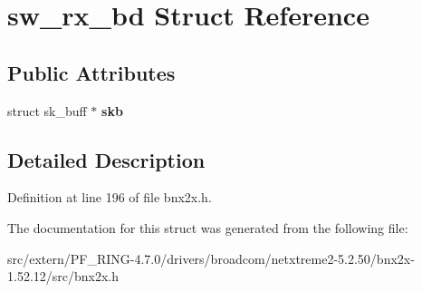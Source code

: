 \hypertarget{structsw__rx__bd}{
\section{sw\_\-rx\_\-bd Struct Reference}
\label{structsw__rx__bd}
}
\subsection*{Public Attributes}
\begin{DoxyCompactItemize}
\item 
\hypertarget{structsw__rx__bd_a35b0d9dafc6281de60d54722f16a5ba2}{
struct sk\_\-buff $\ast$ {\bfseries skb}}
\label{structsw__rx__bd_a35b0d9dafc6281de60d54722f16a5ba2}

\end{DoxyCompactItemize}


\subsection{Detailed Description}


Definition at line 196 of file bnx2x.h.



The documentation for this struct was generated from the following file:\begin{DoxyCompactItemize}
\item 
src/extern/PF\_\-RING-\/4.7.0/drivers/broadcom/netxtreme2-\/5.2.50/bnx2x-\/1.52.12/src/bnx2x.h\end{DoxyCompactItemize}
